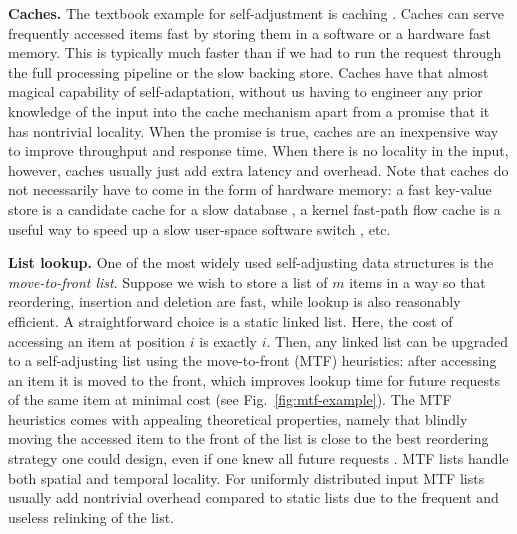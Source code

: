 \noindent%
\textbf{Caches.} %
The textbook example for self-adjustment is caching \cite{295603, rottenstreich2016optimal, 271208}. Caches can serve frequently accessed items fast by storing them in a  software or a hardware fast memory. This is typically much faster than if we had to run the request through the full processing pipeline or the slow backing store. Caches have that almost magical capability of self-adaptation, without us having to engineer any prior knowledge of the input into the cache mechanism apart from a promise that it has nontrivial locality. When the promise is true, caches are an inexpensive way to improve throughput and response time. When there is no locality in the input, however, caches usually just add extra latency and overhead. Note that caches do not necessarily have to come in the form of hardware memory: a fast key-value store is a candidate cache for a slow database \cite{10.5555/1012889.1012894}, a kernel fast-path flow cache is a useful way to speed up a slow user-space software switch \cite{188960}, etc.



\noindent%
\textbf{List lookup.} %
One of the most widely used self-adjusting data structures is the \emph{move-to-front list}. Suppose we wish to store a list of $m$ items in a way so that reordering, insertion and deletion are fast, while lookup is also reasonably efficient. A straightforward choice is a static linked list. Here, the cost of accessing an item at position $i$ is exactly $i$. Then, any linked list can be upgraded to a self-adjusting list using the move-to-front (MTF) heuristics: after accessing an item it is moved to the front, which improves lookup time for future requests of the same item at minimal cost (see Fig.~\ref{fig:mtf-example}). The MTF heuristics comes with appealing theoretical properties, namely that blindly moving the accessed item to the front of the list is close to the best reordering strategy one could design, even if one knew all future requests \cite{SleatorT85}. MTF lists handle both spatial and temporal locality. For uniformly distributed input MTF lists usually add nontrivial overhead compared to static lists due to the frequent and useless relinking of the list.

